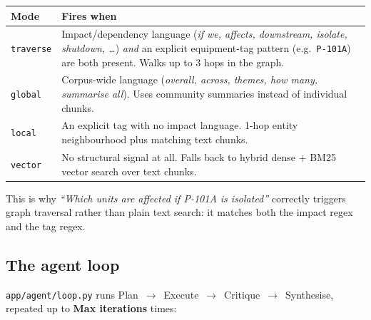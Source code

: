 \documentclass[11pt,a4paper]{article}
\newcommand{\code}[1]{\texttt{\small #1}}
\newcommand{\term}[1]{\textbf{\color{accent}#1}}
\begin{document}
\begin{center}
\renewcommand{\arraystretch}{1.3}
\begin{tabularx}{\linewidth}{@{}l X@{}}
\toprule
\textbf{Mode} & \textbf{Fires when} \\
\midrule
\code{traverse} & Impact/dependency language (\emph{if we, affects, downstream,
  isolate, shutdown, \dots}) \emph{and} an explicit equipment-tag pattern
  (e.g.\ \code{P-101A}) are both present. Walks up to 3 hops in the graph. \\
\code{global} & Corpus-wide language (\emph{overall, across, themes, how many,
  summarise all}). Uses community summaries instead of individual chunks. \\
\code{local} & An explicit tag with no impact language. 1-hop entity
  neighbourhood plus matching text chunks. \\
\code{vector} & No structural signal at all. Falls back to hybrid dense +
  BM25 vector search over text chunks. \\
\bottomrule
\end{tabularx}
\end{center}

This is why \emph{``Which units are affected if P-101A is isolated''} correctly
triggers graph traversal rather than plain text search: it matches both the
impact regex and the tag regex.

\subsection{The agent loop}

\code{app/agent/loop.py} runs Plan~$\rightarrow$~Execute~$\rightarrow$~Critique~$\rightarrow$~Synthesise,
repeated up to \term{Max iterations} times:

\begin{center}
\end{center}
\end{document}
